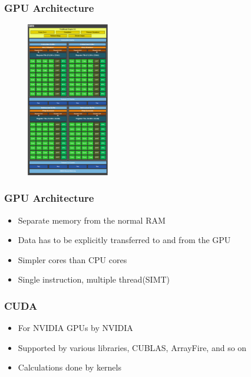 \documentclass{beamer}
\begin{document}
\begin{frame}
\frametitle{GPU Architecture}

\begin{figure}[h]
    \centering
    \includegraphics[width=3.6cm]{../gpu_scheme.png}
    \label{fig:gpu_scheme}
\end{figure}

\end{frame}

\begin{frame}
\frametitle{GPU Architecture}

\begin{itemize}
 \item Separate memory from the normal RAM
 \item Data has to be explicitly transferred to and from the GPU
 \item Simpler cores than CPU cores
 \item Single instruction, multiple thread(SIMT)
\end{itemize}

\end{frame}

\begin{frame}
\frametitle{CUDA}

\begin{itemize}
 \item For NVIDIA GPUs by NVIDIA
 \item Supported by various libraries, CUBLAS, ArrayFire, and so on
 \item Calculations done by kernels
\end{itemize}

\end{frame}
\end{document}
